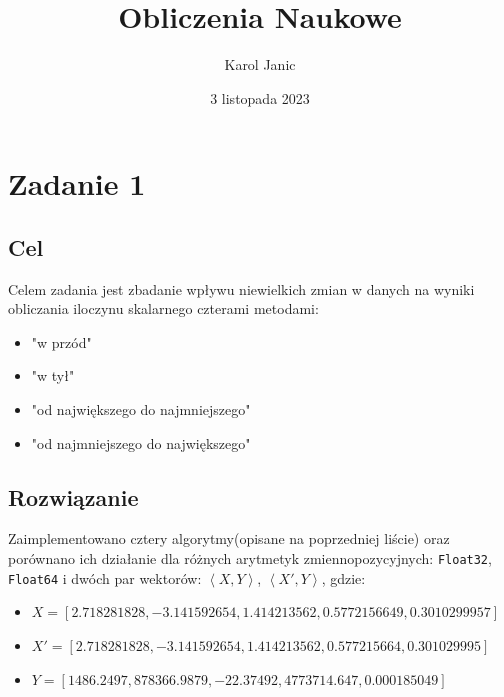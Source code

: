 \documentclass{article}
\title{Obliczenia Naukowe}
\author{Karol Janic}
\date{3 listopada 2023}
\begin{document}
\begin{titlingpage}
    \maketitle
\end{titlingpage}

\tableofcontents

\newpage

\section{Zadanie 1}
\subsection{Cel}
Celem zadania jest zbadanie wpływu niewielkich zmian w danych na wyniki obliczania iloczynu skalarnego czterami metodami:
\begin{itemize}
    \item "w przód"
    \item "w tył"
    \item "od największego do najmniejszego"
    \item "od najmniejszego do największego"
\end{itemize} 

\subsection{Rozwiązanie}
Zaimplementowano cztery algorytmy(opisane na poprzedniej liście) oraz porównano ich działanie 
\newline dla różnych arytmetyk zmiennopozycyjnych: \texttt{Float32}, \texttt{Float64} i dwóch par wektorów: $\left< X, Y \right>$, $\left< X', Y \right>$, \newline gdzie:
\begin{itemize}
    \item $X = [2.718281828, -3.141592654, 1.414213562, 0.5772156649, 0.3010299957]$ 
    \item $X' = [2.718281828, -3.141592654, 1.414213562, 0.577215664, 0.301029995]$
    \item $Y = [1486.2497, 878366.9879, -22.37492, 4773714.647, 0.000185049]$ 
\end{itemize}
\end{document}
